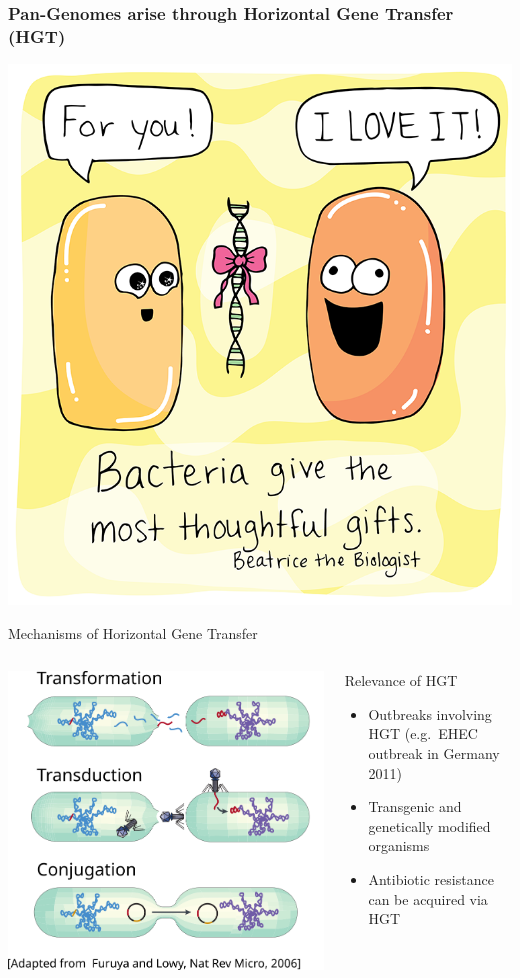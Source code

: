 \documentclass[notes=hide]{beamer}
\newcommand{\0}{\ensuremath{\mathtt{0}}}
\newcommand{\1}{\ensuremath{\mathtt{1}}}
\begin{document}
\begin{frame}[label=bacteria]
\frametitle{Pan-Genomes arise through Horizontal Gene Transfer (HGT)}
\begin{center}
\includegraphics[width=.5\textwidth]{figs/hgt_present}
\end{center}
\end{frame}

\begin{frame}{Mechanisms of Horizontal Gene Transfer}
\begin{columns}
\begin{column}{.55\textwidth}
\includegraphics[width=\columnwidth]{figs/hgt-mechanisms}
\end{column}
\begin{column}{.45\textwidth}
\begin{block}{Relevance of HGT}
\begin{itemize}
 \item Outbreaks involving HGT (e.g.\ EHEC outbreak in Germany 2011)
 \item Transgenic and genetically modified organisms
 \item Antibiotic resistance can be acquired via HGT
\end{itemize} 
\end{block}
\end{column}
\end{columns}
\end{frame}
\end{document}
